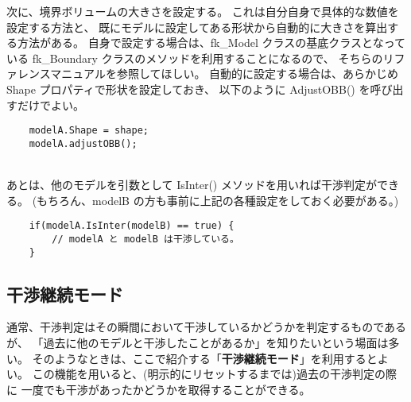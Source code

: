 次に、境界ボリュームの大きさを設定する。
これは自分自身で具体的な数値を設定する方法と、
既にモデルに設定してある形状から自動的に大きさを算出する方法がある。
自身で設定する場合は、fk\_Model クラスの基底クラスとなっている
fk\_Boundary クラスのメソッドを利用することになるので、
そちらのリファレンスマニュアルを参照してほしい。
自動的に設定する場合は、あらかじめ Shape プロパティで形状を設定しておき、
以下のように AdjustOBB() を呼び出すだけでよい。
\\
\begin{breakbox}
\begin{verbatim}
    modelA.Shape = shape;
    modelA.adjustOBB();
\end{verbatim}
\end{breakbox}
~ \\
あとは、他のモデルを引数として IsInter() メソッドを用いれば干渉判定ができる。
(もちろん、modelB の方も事前に上記の各種設定をしておく必要がある。)
\\
\begin{breakbox}
\begin{verbatim}
    if(modelA.IsInter(modelB) == true) {
        // modelA と modelB は干渉している。
    }
\end{verbatim}
\end{breakbox}

\subsection{干渉継続モード}
通常、干渉判定はその瞬間において干渉しているかどうかを判定するものであるが、
「過去に他のモデルと干渉したことがあるか」を知りたいという場面は多い。
そのようなときは、ここで紹介する「\textbf{干渉継続モード}」を利用するとよい。
この機能を用いると、(明示的にリセットするまでは)過去の干渉判定の際に
一度でも干渉があったかどうかを取得することができる。

